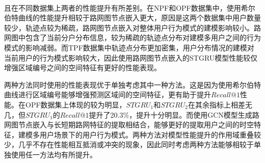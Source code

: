 \documentclass[master]{thesis-uestc}
\begin{document}
\\
\begin{table}[!ht]
\centering
\caption{路网特征嵌入和标签特征增强在TPF数据集上的性能}%
\label{Table.4.2.3}
\end{table}

且在不同数据集上两者的性能提升有所差别。在NPF和OPF数据集中，使用希尔伯特曲线的性能提升相较于路网图节点嵌入更大，原因是这两个数据集中用户数量较少，轨迹点较为稀疏，路网图节点嵌入对整体用户行为模式的建模影响较小。路网图中包含了当前分户分布信息，较为稀疏的轨迹点分布对建模多用户之间的行为模式的影响减弱。而TPF数据集中轨迹点分布更加密集，用户分布情况的建模对当前用户的行为模式影响较大，因此使用路网图节点嵌入的STGRU模型性能较仅增强区域编号之间的空间特征有更好的性能表现。

两种方法同时使用的性能表现优于单独考虑其中一种方法。这是因为使用希尔伯特曲线进行区域编号能够增强预测区域间的空间特征，更有助于提升$Recall@1$性能。在OPF数据集上体现的较为明显，$STGRU_1$和$STGRU_2$在其余指标上相差无几，但$STGRU_1$的$Recall@1$提升了20.3$\%$，提升十分明显。而使用GCN模型生成路网图节点嵌入与长短期路网特征的提取相结合，能够更好的提取用户之间的时空特征，建模多用户场景下的用户行为模式。两种方法对模型性能提升的作用域重叠较少，几乎不存在性能相互抵消或冲突的现象，因此同时考虑两种方法能够相较于单独使用任一方法均有所提升。
\end{document}
